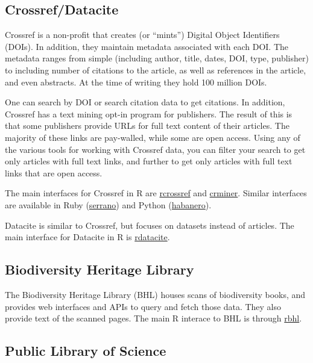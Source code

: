 \documentclass[author-year, review, 11pt]{components/elsarticle} %
\begin{document}
\hypertarget{crossrefdatacite}{%
\subsection{Crossref/Datacite}\label{crossrefdatacite}}

Crossref is a non-profit that creates (or ``mints'') Digital Object
Identifiers (DOIs). In addition, they maintain metadata associated with
each DOI. The metadata ranges from simple (including author, title,
dates, DOI, type, publisher) to including number of citations to the
article, as well as references in the article, and even abstracts. At
the time of writing they hold 100 million DOIs.

One can search by DOI or search citation data to get citations. In
addition, Crossref has a text mining opt-in program for publishers. The
result of this is that some publishers provide URLs for full text
content of their articles. The majority of these links are pay-walled,
while some are open access. Using any of the various tools for working
with Crossref data, you can filter your search to get only articles with
full text links, and further to get only articles with full text links
that are open access.

The main interfaces for Crossref in R are
\href{https://github.com/ropensci/rcrossref}{rcrossref} and
\href{https://github.com/ropensci/crminer}{crminer}. Similar interfaces
are available in Ruby
(\href{https://github.com/sckott/serrano}{serrano}) and Python
(\href{https://github.com/sckott/habanero}{habanero}).

Datacite is similar to Crossref, but focuses on datasets instead of
articles. The main interface for Datacite in R is
\href{https://github.com/ropensci/rdatacite}{rdatacite}.

\hypertarget{biodiversity-heritage-library}{%
\subsection{Biodiversity Heritage
Library}\label{biodiversity-heritage-library}}

The Biodiversity Heritage Library (BHL) houses scans of biodiversity
books, and provides web interfaces and APIs to query and fetch those
data. They also provide text of the scanned pages. The main R interace
to BHL is through \href{https://github.com/ropensci/rbhl}{rbhl}.

\hypertarget{public-library-of-science}{%
\subsection{Public Library of Science}\label{public-library-of-science}}
\end{document}
